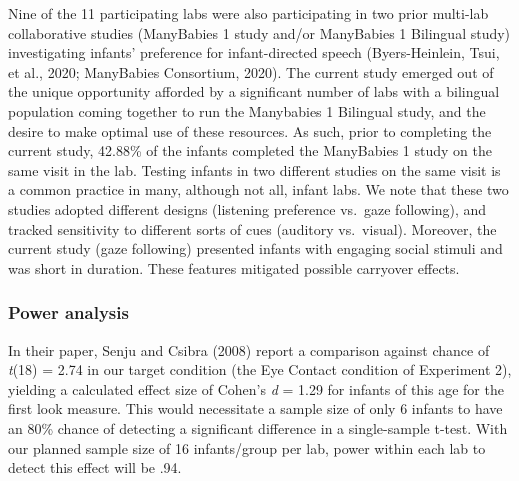 \documentclass[english,,man,floatsintext]{apa6}
\begin{document}
Nine of the 11 participating labs were also participating in two prior multi-lab collaborative studies (ManyBabies 1 study and/or ManyBabies 1 Bilingual study) investigating infants' preference for infant-directed speech (Byers-Heinlein, Tsui, et al., 2020; ManyBabies Consortium, 2020). The current study emerged out of the unique opportunity afforded by a significant number of labs with a bilingual population coming together to run the Manybabies 1 Bilingual study, and the desire to make optimal use of these resources. As such, prior to completing the current study, 42.88\% of the infants completed the ManyBabies 1 study on the same visit in the lab. Testing infants in two different studies on the same visit is a common practice in many, although not all, infant labs. We note that these two studies adopted different designs (listening preference vs.~gaze following), and tracked sensitivity to different sorts of cues (auditory vs.~visual). Moreover, the current study (gaze following) presented infants with engaging social stimuli and was short in duration. These features mitigated possible carryover effects.

\hypertarget{power-analysis}{%
\subsubsection{Power analysis}\label{power-analysis}}

In their paper, Senju and Csibra (2008) report a comparison against chance of \emph{t}(18) = 2.74 in our target condition (the Eye Contact condition of Experiment 2), yielding a calculated effect size of Cohen's \emph{d} = 1.29 for infants of this age for the first look measure. This would necessitate a sample size of only 6 infants to have an 80\% chance of detecting a significant difference in a single-sample t-test. With our planned sample size of 16 infants/group per lab, power within each lab to detect this effect will be .94.
\end{document}
